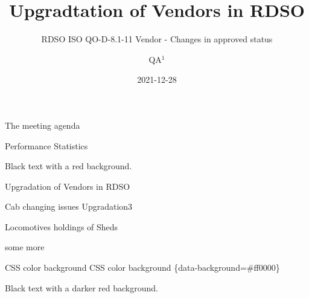 \documentclass[
  ignorenonframetext,
]{beamer}
\title{Upgradtation of Vendors in RDSO}
\subtitle{RDSO ISO QO-D-8.1-11 Vendor - Changes in approved status}
\author{QA\(^1\)}
\date{2021-12-28}
\institute{\(^1\)QA(Mech)}
\begin{document}
\frame{\titlepage}

\begin{frame}[allowframebreaks]
  \tableofcontents[hideallsubsections]
\end{frame}
\begin{frame}
\end{frame}

\begin{frame}{The meeting agenda}
\protect\hypertarget{the-meeting-agenda}{}
\end{frame}

\begin{frame}{Performance Statistics}
\protect\hypertarget{performance-statistics}{}
\begin{shaded}
Black text with a red background.
\end{shaded}


\begin{block}{Upgradation of Vendors in RDSO}
\protect\hypertarget{upgradation-of-vendors-in-rdso}{}
\begin{block}{Cab changing issues}
\protect\hypertarget{cab-changing-issues}{}
Upgradation3
\end{block}
\end{block}
\end{frame}

\begin{frame}{Locomotives holdings of Sheds}
\protect\hypertarget{locomotives-holdings-of-sheds}{}
\end{frame}

\begin{frame}{some more}
\protect\hypertarget{some-more}{}
\end{frame}

\begin{frame}{CSS color background}
\protect\hypertarget{css-color-background}{}
CSS color background \{data-background=\#ff0000\}


\begin{shaded}

Black text with a darker red background.

\end{shaded}
\end{frame}
\end{document}
